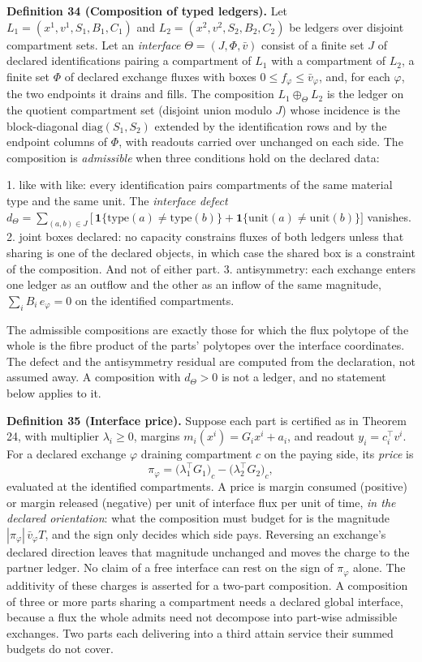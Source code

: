 \documentclass[11pt]{article}
\begin{document}
\textbf{Definition 34 (Composition of typed ledgers).} Let \(L_1 = (x^1, v^1, S_1, B_1, C_1)\) and \(L_2 = (x^2, v^2, S_2, B_2, C_2)\) be ledgers over disjoint compartment sets. Let an \emph{interface} \(\Theta = (J, \Phi, \bar v)\) consist of a finite set \(J\) of declared identifications pairing a compartment of \(L_1\) with a compartment of \(L_2\), a finite set \(\Phi\) of declared exchange fluxes with boxes \(0 \le f_\varphi \le \bar v_\varphi\), and, for each \(\varphi\), the two endpoints it drains and fills. The composition \(L_1 \oplus_\Theta L_2\) is the ledger on the quotient compartment set (disjoint union modulo \(J\)) whose incidence is the block-diagonal \(\mathrm{diag}(S_1, S_2)\) extended by the identification rows and by the endpoint columns of \(\Phi\), with readouts carried over unchanged on each side. The composition is \emph{admissible} when three conditions hold on the declared data:

1. like with like: every identification pairs compartments of the same material type and the same unit. The \emph{interface defect} \(d_\Theta = \sum_{(a,b) \in J} \bigl[\,\mathbf 1\{\mathrm{type}(a) \ne \mathrm{type}(b)\} + \mathbf 1\{\mathrm{unit}(a) \ne \mathrm{unit}(b)\}\bigr]\) vanishes. 2. joint boxes declared: no capacity constrains fluxes of both ledgers unless that sharing is one of the declared objects, in which case the shared box is a constraint of the composition. And not of either part. 3. antisymmetry: each exchange enters one ledger as an outflow and the other as an inflow of the same magnitude, \(\textstyle\sum_{i} B_i\, e_\varphi = 0\) on the identified compartments.

The admissible compositions are exactly those for which the flux polytope of the whole is the fibre product of the parts' polytopes over the interface coordinates. The defect and the antisymmetry residual are computed from the declaration, not assumed away. A composition with \(d_\Theta > 0\) is not a ledger, and no statement below applies to it.

\textbf{Definition 35 (Interface price).} Suppose each part is certified as in Theorem 24, with multiplier \(\lambda_i \ge 0\), margins \(m_i(x^i) = G_i x^i + a_i\), and readout \(y_i = c_i^{\top} v^i\). For a declared exchange \(\varphi\) draining compartment \(c\) on the paying side, its \emph{price} is \[
\pi_\varphi = \bigl(\lambda_1^{\top} G_1\bigr)_c - \bigl(\lambda_2^{\top} G_2\bigr)_c ,
\] evaluated at the identified compartments. A price is margin consumed (positive) or margin released (negative) per unit of interface flux per unit of time, \emph{in the declared orientation}: what the composition must budget for is the magnitude \(|\pi_\varphi|\,\bar v_\varphi T\), and the sign only decides which side pays. Reversing an exchange's declared direction leaves that magnitude unchanged and moves the charge to the partner ledger. No claim of a free interface can rest on the sign of \(\pi_\varphi\) alone. The additivity of these charges is asserted for a two-part composition. A composition of three or more parts sharing a compartment needs a declared global interface, because a flux the whole admits need not decompose into part-wise admissible exchanges. Two parts each delivering into a third attain service their summed budgets do not cover.
\end{document}
